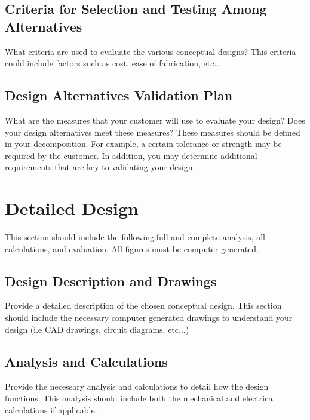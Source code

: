 \documentclass{ipfwpaper}
\begin{document}
\subsection{Criteria for Selection and Testing Among Alternatives}

What criteria are used to evaluate the various conceptual designs? This criteria could include factors such as cost, ease of fabrication, etc...


\subsection{Design Alternatives Validation Plan}

What are the measures that your customer will use to evaluate your design? Does your design alternatives meet these measures? These measures should be defined in your decomposition. For example, a certain tolerance or strength may be required by the customer. In addition, you may determine additional requirements that are key to validating your design. 



\clearpage
\section{Detailed Design}
This section should include the following:full and complete analysis, all calculations, and evaluation. All figures must be computer generated. 

\subsection{Design Description and Drawings}
Provide a detailed description of the chosen conceptual design. This section should include the necessary computer generated drawings to understand your design (i.e CAD drawings, circuit diagrams, etc...)

\subsection{Analysis and Calculations}
Provide the necessary analysis and calculations to detail how the design functions. This analysis should include both the mechanical and electrical calculations if applicable.
\end{document}
